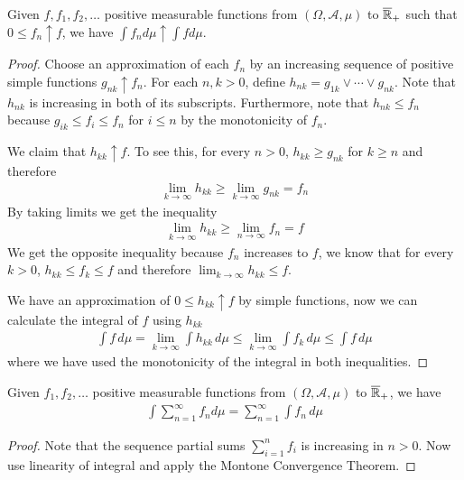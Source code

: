 \begin{thm}\label{MCT}Given $f, f_1,
  f_2, \dots$ positive measurable functions from
  $(\Omega, \mathcal{A}, \mu)$ to $\overline{\mathbb{R}}_+$ such that $0 \leq f_n \uparrow f$, we
  have $\int f_n d \mu \uparrow \int f d \mu$.
\end{thm}
\begin{proof}Choose an approximation of each $f_n$ by an increasing
  sequence of positive simple functions $g_{nk} \uparrow f_n$.  For
  each $n,k>0$, define $h_{nk} = g_{1k} \vee \cdots \vee g_{nk}$.
  Note that $h_{nk}$ is increasing in both of its subscripts.
  Furthermore, note that $h_{nk} \leq f_n$ because $g_{ik} \leq f_{i}
  \leq f_n$ for $i \leq n$ by the monotonicity of $f_n$.

We  claim that $h_{kk} \uparrow f$.  To see this, for every $n>0$,
  $h_{kk} \geq g_{nk}$ for $k \geq n$ and therefore
\begin{align*}
\lim_{k \to \infty} h_{kk} \geq \lim_{k \to \infty} g_{nk} = f_n
\end{align*}
By taking limits we get the inequality
\begin{align*}
\lim_{k \to \infty} h_{kk} \geq \lim_{n \to \infty} f_n = f
\end{align*}
We get the opposite inequality because $f_n$ increases to $f$, we know that for
every $k>0$, $h_{kk} \leq f_k \leq f$ and therefore $\lim_{k \to
  \infty} h_{kk} \leq f$.

We have an approximation of $0 \leq h_{kk} \uparrow f$ by simple
functions, now we can calculate the integral of $f$ using $h_{kk}$
\begin{align*}
\int f \, d\mu = \lim_{k \to \infty} \int h_{kk} \, d\mu \leq \lim_{k
  \to \infty} \int f_k \, d\mu \leq \int f \, d\mu
\end{align*}
where we have used the monotonicity of the integral in both
inequalities.  
\end{proof}
\begin{cor}\label{TonelliIntegralSum}Given $f_1,
  f_2, \dots$ positive measurable functions from
  $(\Omega, \mathcal{A}, \mu)$ to $\overline{\mathbb{R}}_+$, we
  have 
\begin{align*}
\int \sum_{n=1}^\infty f_n d \mu = \sum_{n=1}^\infty \int f_n \, d \mu
\end{align*}
\end{cor}
\begin{proof}Note that the sequence partial sums $\sum_{i=1}^n f_i$ is
  increasing in $n>0$.  Now use linearity of integral and apply the Montone Convergence Theorem.
\end{proof}

